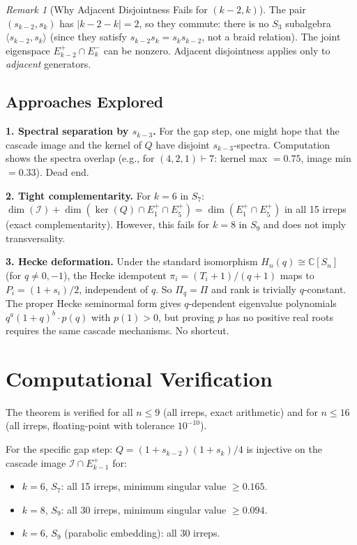 \documentclass[11pt]{article}
\theoremstyle{definition}
\theoremstyle{remark}
\newtheorem{remark}[theorem]{Remark}
\begin{document}
\begin{remark}[Why Adjacent Disjointness Fails for $(k{-}2, k)$]
The pair $(s_{k-2}, s_k)$ has $|k{-}2 - k| = 2$, so they commute:
there is no $S_3$ subalgebra $\langle s_{k-2}, s_k \rangle$
(since they satisfy $s_{k-2} s_k = s_k s_{k-2}$, not a braid relation).
The joint eigenspace $E_{k-2}^+ \cap E_k^-$ can be nonzero.
Adjacent disjointness applies only to \emph{adjacent} generators.
\end{remark}

\subsection{Approaches Explored}

\textbf{1. Spectral separation by $s_{k-3}$.}
For the gap step, one might hope that the cascade image and the kernel
of $Q$ have disjoint $s_{k-3}$-spectra. Computation shows the spectra
overlap (e.g., for $(4,2,1) \vdash 7$: kernel max $= 0.75$,
image min $= 0.33$). Dead end.

\textbf{2. Tight complementarity.}
For $k=6$ in $S_7$: $\dim(\mathcal{I}) + \dim(\ker(Q) \cap E_1^+ \cap E_5^+)
= \dim(E_1^+ \cap E_5^+)$ in all 15 irreps (exact complementarity).
However, this fails for $k=8$ in $S_9$ and does not imply transversality.

\textbf{3. Hecke deformation.}
Under the standard isomorphism $H_n(q) \cong \mathbb{C}[S_n]$ (for $q \neq 0, -1$),
the Hecke idempotent $\pi_i = (T_i+1)/(q+1)$ maps to $P_i = (1+s_i)/2$,
independent of $q$. So $\Pi_q = \Pi$ and rank is trivially $q$-constant.
The proper Hecke seminormal form gives $q$-dependent eigenvalue polynomials
$q^a(1+q)^b \cdot p(q)$ with $p(1) > 0$, but proving $p$ has no positive
real roots requires the same cascade mechanisms. No shortcut.

\section{Computational Verification}

The theorem is verified for all $n \leq 9$ (all irreps, exact arithmetic)
and for $n \leq 16$ (all irreps, floating-point with tolerance $10^{-10}$).

For the specific gap step: $Q = (1+s_{k-2})(1+s_k)/4$ is injective on the
cascade image $\mathcal{I} \cap E_{k-1}^+$ for:
\begin{itemize}
\item $k=6$, $S_7$: all 15 irreps, minimum singular value $\geq 0.165$.
\item $k=8$, $S_9$: all 30 irreps, minimum singular value $\geq 0.094$.
\item $k=6$, $S_9$ (parabolic embedding): all 30 irreps.
\end{itemize}
\end{document}
